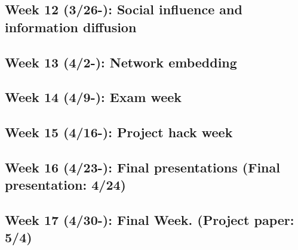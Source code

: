 \documentclass[11pt,article,oneside]{memoir} %
\begin{document}
\subsection{Week 12 (3/26-): Social influence and information diffusion}
\subsection{Week 13 (4/2-): Network embedding}
\subsection{Week 14 (4/9-): Exam week}
\subsection{Week 15 (4/16-): Project hack week}
\subsection{Week 16 (4/23-): Final presentations (Final presentation: 4/24)}
\subsection{Week 17 (4/30-): Final Week. (Project paper: 5/4)}

\end{document}
